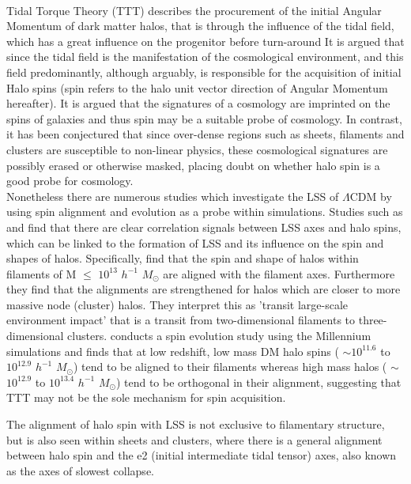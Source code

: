 \documentclass[a4paper,fleqn,usenatbib]{mnras}
\def \lcdm{$\Lambda$CDM }
\begin{document}
\\
Tidal Torque Theory (TTT) describes the procurement of the initial Angular Momentum of dark matter halos, that is through the influence of the tidal field, which has a great influence on the progenitor before turn-around \citep[Holye 1949][]{Peebles_69,Zeldovich_70} 
It is argued that since the tidal field is the manifestation of the cosmological environment, and this field predominantly, although arguably, is responsible for the acquisition of initial Halo spins (spin refers to the halo unit vector direction of Angular Momentum hereafter). It is argued that the signatures of a cosmology are imprinted on the spins of galaxies \citep{Lee_pen_00} and thus spin may be a suitable probe of cosmology. In contrast, it has been conjectured that since over-dense regions such as sheets, filaments and clusters are susceptible to non-linear physics, these cosmological signatures are possibly erased or otherwise masked, placing doubt on whether halo spin is a good probe for cosmology.
\\
Nonetheless there are numerous studies which investigate the  LSS of \lcdm by using spin alignment and evolution as a probe within simulations. Studies such as \citet{Faltenbacher_02,Calvo_07,Zhang_09} and \citet{Hahn_07} find that there are clear correlation signals between LSS axes and halo spins, which can be linked to the formation of LSS and its influence on the spin and shapes of halos. Specifically, \citet{Zhang_09} find that the spin and shape of halos within filaments of M $\leq$ $10^{13}$ $h^{-1}$ \(M_\odot\) are aligned with the filament axes. Furthermore they find that the alignments are strengthened for halos which are closer to more massive node (cluster) halos. They interpret this as 'transit large-scale environment impact' that is a transit from two-dimensional filaments to three-dimensional clusters.
\citet{Trowland_13} conducts a spin evolution study using the Millennium simulations and finds that at low redshift, low mass DM halo spins ( $\sim$$10^{11.6}$ to $10^{12.9}$ $h^{-1}$ \(M_\odot\)) tend to be aligned to their filaments whereas high mass halos ( $\sim$ $10^{12.9}$ to $10^{13.4}$ $h^{-1}$ \(M_\odot\)) tend to be orthogonal in their alignment, suggesting that TTT may not be the sole mechanism for spin acquisition.  

The alignment of halo spin with LSS is not exclusive to filamentary structure, but is also seen within sheets and clusters, where there is a general alignment between halo spin and the e2 (initial intermediate tidal tensor) axes, also known as the axes of slowest collapse. \citep{Libeskind_12,Dubois_14,Calvo_14,Kang_15,Wang_17,Veena_18} 
\end{document}
